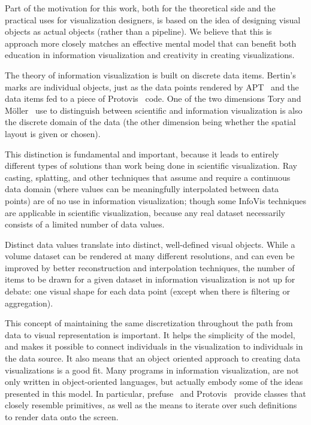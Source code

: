 \label{cognitiveMotivation}

Part of the motivation for this work, both for the theoretical side and the practical uses for visualization designers, is based on the idea of designing visual objects as actual objects (rather than a pipeline).
We believe that this is approach more closely matches an effective mental model that can benefit both education in information visualization and creativity in creating visualizations.

\label{infoVisModel}

The theory of information visualization is built on discrete data items.
Bertin's marks are individual objects, just as the data points rendered by APT~\cite{Mackinlay1986} and the data items fed to a piece of Protovis~\cite{bostock2009Protovis} code.
One of the two dimensions Tory and M\"oller~\cite{tory2004rethinking} use to distinguish between scientific and information visualization is also the discrete domain of the data (the other dimension being whether the spatial layout is given or chosen).

This distinction is fundamental and important, because it leads to entirely different types of solutions than work being done in scientific visualization.
Ray casting, splatting, and other techniques that assume and require a continuous data domain (where values can be meaningfully interpolated between data points) are of no use in information visualization; though some InfoVis techniques are applicable in scientific visualization, because any real dataset necessarily consists of a limited number of data values.

Distinct data values translate into distinct, well-defined visual objects.
While a volume dataset can be rendered at many different resolutions, and can even be improved by better reconstruction and interpolation techniques, the number of items to be drawn for a given dataset in information visualization is not up for debate: one visual shape for each data point (except when there is filtering or aggregation).

This concept of maintaining the same discretization throughout the path from data to visual representation is important.
It helps the simplicity of the model, and makes it possible to connect individuals in the visualization to individuals in the data source.
It also means that an object oriented approach to creating data visualizations is a good fit.
Many programs in information visualization, are not only written in object-oriented languages, but actually embody some of the ideas presented in this model.
In particular, prefuse~\cite{heer2005prefuse} and Protovis~\cite{bostock2009Protovis} provide classes that closely resemble primitives, as well as the means to iterate over such definitions to render data onto the screen.

